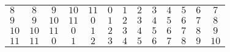 \documentclass[12pt, a4paper]{article}
\begin{document}
\begin{solution}
\begin{center}
\begin{table}[h]
\begin{tabular}{ccccccccccccc}
\multicolumn{1}{l|}{$8$}  & \multicolumn{1}{c|}{$8$}  & \multicolumn{1}{c|}{$9$}  & \multicolumn{1}{c|}{$10$} & \multicolumn{1}{c|}{$11$} & \multicolumn{1}{c|}{$0$}  & \multicolumn{1}{c|}{$1$}  & \multicolumn{1}{c|}{$2$}  & \multicolumn{1}{c|}{$3$}  & \multicolumn{1}{c|}{$4$}  & \multicolumn{1}{c|}{$5$}  & \multicolumn{1}{c|}{$6$}  & \multicolumn{1}{c|}{$7$}  \\ \cline{2-13} 
\multicolumn{1}{l|}{$9$}  & \multicolumn{1}{c|}{$9$}  & \multicolumn{1}{c|}{$10$} & \multicolumn{1}{c|}{$11$} & \multicolumn{1}{c|}{$0$}  & \multicolumn{1}{c|}{$1$}  & \multicolumn{1}{c|}{$2$}  & \multicolumn{1}{c|}{$3$}  & \multicolumn{1}{c|}{$4$}  & \multicolumn{1}{c|}{$5$}  & \multicolumn{1}{c|}{$6$}  & \multicolumn{1}{c|}{$7$}  & \multicolumn{1}{c|}{$8$}  \\ \cline{2-13} 
\multicolumn{1}{l|}{$10$} & \multicolumn{1}{c|}{$10$} & \multicolumn{1}{c|}{$11$} & \multicolumn{1}{c|}{$0$}  & \multicolumn{1}{c|}{$1$}  & \multicolumn{1}{c|}{$2$}  & \multicolumn{1}{c|}{$3$}  & \multicolumn{1}{c|}{$4$}  & \multicolumn{1}{c|}{$5$}  & \multicolumn{1}{c|}{$6$}  & \multicolumn{1}{c|}{$7$}  & \multicolumn{1}{c|}{$8$}  & \multicolumn{1}{c|}{$9$}  \\ \cline{2-13} 
\multicolumn{1}{l|}{$11$} & \multicolumn{1}{c|}{$11$} & \multicolumn{1}{c|}{$0$}  & \multicolumn{1}{c|}{$1$}  & \multicolumn{1}{c|}{$2$}  & \multicolumn{1}{c|}{$3$}  & \multicolumn{1}{c|}{$4$}  & \multicolumn{1}{c|}{$5$}  & \multicolumn{1}{c|}{$6$}  & \multicolumn{1}{c|}{$7$}  & \multicolumn{1}{c|}{$8$}  & \multicolumn{1}{c|}{$9$}  & \multicolumn{1}{c|}{$10$} \\ \cline{2-13} 
\end{tabular}
\end{table}


\end{center}
\end{solution}
\end{document}
